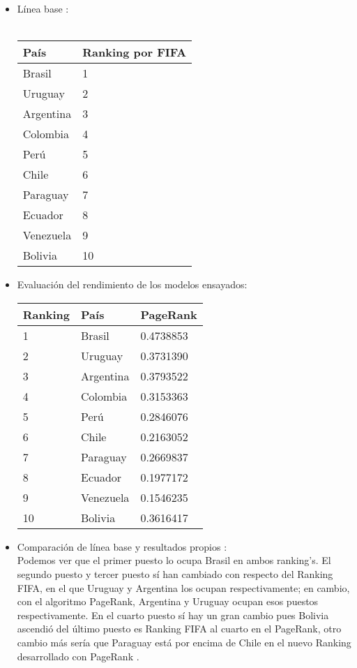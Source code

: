 \documentclass[twocolumn]{article}
\begin{document}
\begin{itemize}
	\item
Línea base :\\ \\
    \begin{tabular}{|l|l|}
	\hline
País & Ranking por FIFA \\
\hline \hline
Brasil & 1\\ \hline
Uruguay & 2 \\ \hline
Argentina & 3 \\ \hline
Colombia & 4 \\ \hline
Perú & 5 \\ \hline
Chile & 6 \\ \hline
Paraguay & 7 \\ \hline
Ecuador & 8 \\ \hline
Venezuela & 9 \\ \hline
Bolivia & 10 \\ \hline
\end{tabular}
	\item
Evaluación del rendimiento de los modelos ensayados: \\

	\begin{tabular}{|l|l|l|}
	\hline
Ranking & País  & PageRank\\
\hline \hline \hline
1&Brasil & 0.4738853  \\ \hline
2&Uruguay & 0.3731390  \\ \hline
3&Argentina & 0.3793522  \\ \hline
4&Colombia & 0.3153363  \\ \hline
5&Perú & 0.2846076  \\ \hline
6&Chile & 0.2163052 \\ \hline
7&Paraguay & 0.2669837  \\ \hline
8&Ecuador & 0.1977172 \\ \hline
9&Venezuela & 0.1546235 \\ \hline
10&Bolivia & 0.3616417  \\ \hline

\end{tabular}
    \item
    Comparación de línea base y resultados propios :\\ 
 Podemos ver que el primer puesto lo ocupa Brasil en ambos ranking's. El segundo puesto y tercer puesto sí han cambiado con respecto del Ranking FIFA, en el que Uruguay y Argentina los ocupan respectivamente; en cambio, con el algoritmo PageRank, Argentina y Uruguay ocupan esos puestos respectivamente. En el cuarto puesto sí hay un gran cambio pues Bolivia ascendió del último puesto es Ranking FIFA al cuarto en el PageRank, otro cambio más sería que Paraguay está por encima de Chile en el nuevo Ranking desarrollado con PageRank .
	\end{itemize}	
\end{document}
